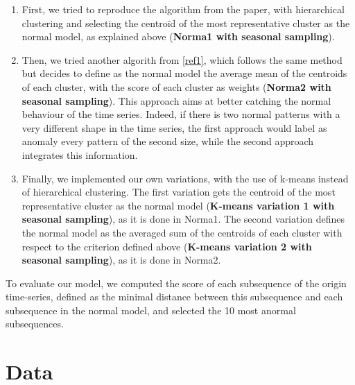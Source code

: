\documentclass[11pt]{article}
\begin{document}
\begin{enumerate}
    \item First, we tried to reproduce the algorithm from the paper, with hierarchical clustering and selecting the centroïd of the most representative cluster as the normal model, as explained above (\textbf{Norma1 with seasonal sampling}).\\
    \item Then, we tried another algorith from \ref{ref1}, which follows the same method but decides to define as the normal model the average mean of the centroids of each cluster, with the score of each cluster as weights (\textbf{Norma2 with seasonal sampling}). 
        This approach aims at better catching the normal behaviour of the time series. 
        Indeed, if there is two normal patterns with a very different shape in the time series, the first approach would label as anomaly every pattern of the second size, while the second approach integrates this information. \\
    \item   Finally, we implemented our own variations, with the use of k-means instead of hierarchical clustering. 
            The first variation gets the centroid of the most representative cluster as the normal model (\textbf{K-means variation 1 with seasonal sampling}), as it is done in Norma1. 
            The second variation defines the normal model as the averaged sum of the centroids of each cluster with respect to the criterion defined above (\textbf{K-means variation 2 with seasonal sampling}), as it is done in Norma2. 

\end{enumerate}




To evaluate our model, we computed the score of each subsequence of the origin time-series, defined as the minimal distance between this subsequence and each subsequence in the normal model, and selected the 10 most anormal subsequences.


\section{Data}
\end{document}
